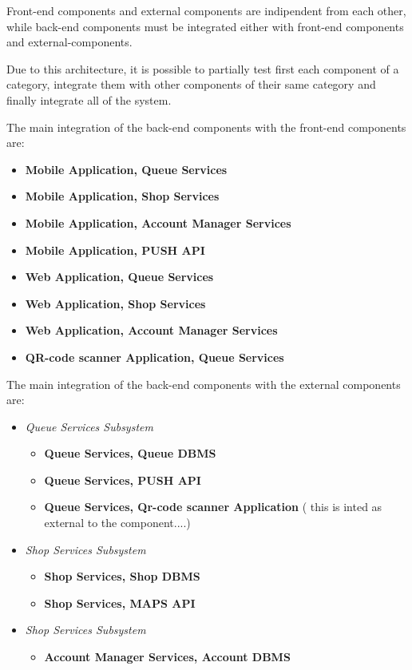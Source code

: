 Front-end components and external components are indipendent from each other, while back-end components must be integrated either with front-end components and external-components.

 Due to this architecture, it is possible to partially test first each component of a category, integrate them with other components of their same category and finally integrate all of the system.

 The main integration of the back-end components with the front-end components are:

 \begin{itemize}
    \item \textbf{Mobile Application, Queue Services}
    \item \textbf{Mobile Application, Shop Services}
    \item \textbf{Mobile Application, Account Manager Services}
    \item \textbf{Mobile Application, PUSH API}
    \item \textbf{Web Application, Queue Services}
    \item \textbf{Web Application, Shop Services}
    \item \textbf{Web Application, Account Manager Services}
    \item \textbf{QR-code scanner Application, Queue Services}
 \end{itemize}

 The main integration of the back-end components with the external components are:

 \begin{itemize}
    \item \textit{Queue Services Subsystem}
    \begin{itemize}    
        \item \textbf{Queue Services, Queue DBMS}
        \item \textbf{Queue Services, PUSH API}
        \item \textbf{Queue Services, Qr-code scanner Application} ( this is inted as external to the component....)
    \end{itemize}
    \item \textit{Shop Services Subsystem}
     \begin{itemize}  
        \item \textbf{Shop Services, Shop DBMS}
        \item \textbf{Shop Services, MAPS API}
     \end{itemize}
     \item \textit{Shop Services Subsystem}
     \begin{itemize}  
        \item \textbf{Account Manager Services, Account DBMS}
     \end{itemize}  
 \end{itemize}

